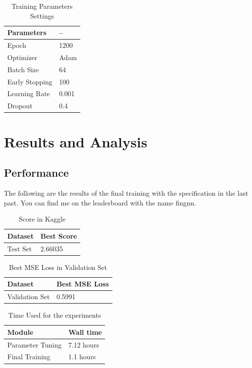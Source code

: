 \documentclass{article}
\begin{document}
\begin{table}[htb]
	\caption{Training Parameters Settings}
	\label{sample-table}
	\centering
	\begin{tabular}{ll}
		\toprule
		\cmidrule{1-2}
		Parameters & -- \\
		\midrule
		Epoch & 1200 \\
		Optimizer & Adam \\
		Batch Size & 64 \\
		Early Stopping & 100 \\
		Learning Rate & 0.001 \\
		Dropout & 0.4 \\
		\midrule
	\end{tabular}
\end{table}


\section{Results and Analysis}

\subsection{Performance}
The following are the results of the final training with the specification in the last past. You can find me on the leaderboard with the name fingnn.

\begin{table}[htb]
	\caption{Score in Kaggle}
	\label{sample-table}
	\centering
	\begin{tabular}{ll}
		\toprule
		\cmidrule{1-2}
		Dataset & Best Score\\
		\midrule
		Test Set & 2.66035   \\
		\bottomrule
	\end{tabular}
\end{table}

\begin{table}[htb]
	\caption{Best MSE Loss in Validation Set}
	\label{sample-table}
	\centering
	\begin{tabular}{ll}
		\toprule
		\cmidrule{1-2}
		Dataset & Best MSE Loss\\
		\midrule
		Validation Set & 0.5991   \\
		\bottomrule
	\end{tabular}
\end{table}

\pagebreak

\begin{table}[htb]
	\caption{Time Used for the experiments}
	\label{sample-table}
	\centering
	\begin{tabular}{ll}
		\toprule
		\cmidrule{1-2}
		Module & Wall time \\
		\midrule
		Parameter Tuning & 7.12 hours \\
		Final Training & 1.1 hours \\
		\midrule
	\end{tabular}
\end{table}
\end{document}
